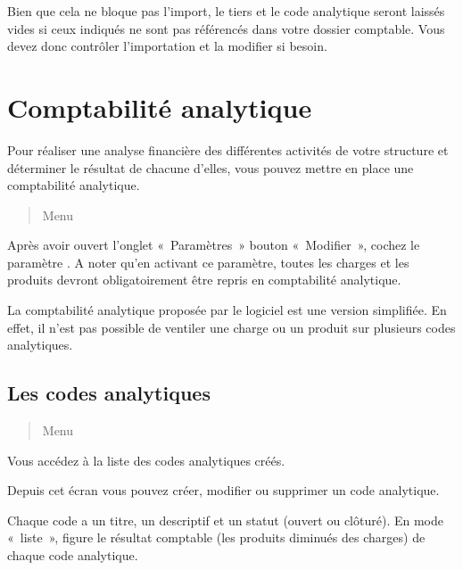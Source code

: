 \documentclass[a4paper,10pt,oneside,french]{sphinxmanual}
\begin{document}
Bien que cela ne bloque pas l’import, le tiers et le code analytique seront laissés vides si ceux indiqués ne sont pas référencés dans votre dossier comptable. Vous devez donc contrôler l’importation et la modifier si besoin.


\section{Comptabilité analytique}
\label{\detokenize{accounting/costaccounting:comptabilite-analytique}}\label{\detokenize{accounting/costaccounting::doc}}
Pour réaliser une analyse financière des différentes activités de votre structure et déterminer le résultat de chacune d’elles, vous pouvez mettre en place une comptabilité analytique.
\begin{quote}

Menu 
\end{quote}

Après avoir ouvert l’onglet « Paramètres » \sphinxhyphen{} bouton « Modifier », cochez le paramètre . A noter qu’en activant ce paramètre, toutes les charges et les produits devront obligatoirement être repris en comptabilité analytique.

La comptabilité analytique proposée par le logiciel est une version simplifiée. En effet, il n’est pas possible de ventiler une charge ou un produit sur plusieurs codes analytiques.


\subsection{Les codes analytiques}
\label{\detokenize{accounting/costaccounting:les-codes-analytiques}}\begin{quote}

Menu 
\end{quote}

Vous accédez à la liste des codes analytiques créés.

Depuis cet écran vous pouvez créer, modifier ou supprimer un code analytique.

Chaque code a un titre, un descriptif et un statut (ouvert ou clôturé).
En mode « liste », figure le résultat comptable (les produits diminués des charges) de chaque code analytique.
\begin{quote}

\noindent{}
\end{quote}
\end{document}

